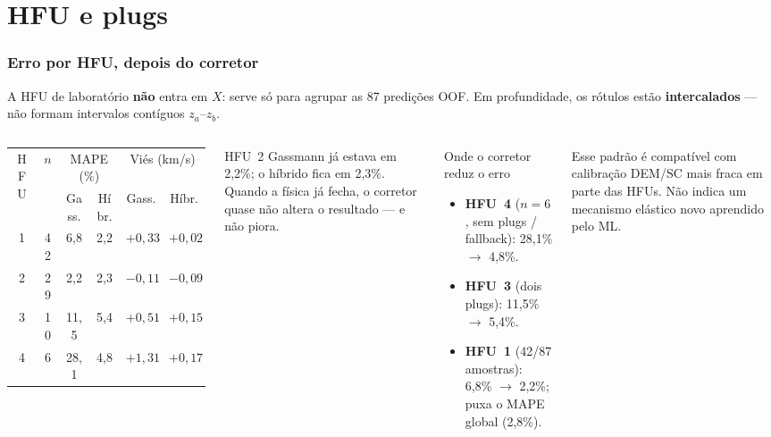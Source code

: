 \documentclass[aspectratio=169,10pt]{beamer}
\begin{document}
\section{HFU e plugs}

\begin{frame}[shrink=5]
  \frametitle{Erro por HFU, depois do corretor}
  \footnotesize
  A HFU de laboratório \textbf{não} entra em $X$: serve só para
  agrupar as 87 predições OOF. Em profundidade, os rótulos estão
  \textbf{intercalados} --- não formam intervalos contíguos
  $z_a$--$z_b$.
  \vspace{0.06cm}
  \begin{columns}[T,onlytextwidth]
    \centering
    \scriptsize
    \setlength{\tabcolsep}{4pt}
    \begin{tabular}{cccccc}
      \toprule
      \multirow{2}{*}{HFU} & \multirow{2}{*}{$n$} &
      \multicolumn{2}{c}{MAPE (\%)} & \multicolumn{2}{c}{Viés (km/s)} \\
      \cmidrule(lr){3-4}\cmidrule(lr){5-6}
       & & Gass. & Híbr. & Gass. & Híbr. \\
      \midrule
      1 & 42 & 6,8 & 2,2 & $+0{,}33$ & $+0{,}02$ \\
      2 & 29 & 2,2 & 2,3 & $-0{,}11$ & $-0{,}09$ \\
      3 & 10 & 11,5 & 5,4 & $+0{,}51$ & $+0{,}15$ \\
      4 & 6  & 28,1 & 4,8 & $+1{,}31$ & $+0{,}17$ \\
      \bottomrule
    \end{tabular}
    \vspace{0.10cm}
    \begin{exampleblock}{HFU~2}
      \scriptsize
      Gassmann já estava em 2,2\%; o híbrido fica em 2,3\%.
      Quando a física já fecha, o corretor quase não altera
      o resultado --- e não piora.
    \end{exampleblock}
    \begin{block}{Onde o corretor reduz o erro}
      \scriptsize
      \begin{itemize}\setlength{\itemsep}{0.12em}
        \item \textbf{HFU~4} ($n=6$, sem plugs / fallback):
              28,1\% $\rightarrow$ 4,8\%.
        \item \textbf{HFU~3} (dois plugs):
              11,5\% $\rightarrow$ 5,4\%.
        \item \textbf{HFU~1} (42/87 amostras):
              6,8\% $\rightarrow$ 2,2\%;
              puxa o MAPE global (2,8\%).
      \end{itemize}
    \end{block}
    \vspace{0.06cm}
    {\scriptsize
    Esse padrão é compatível com calibração DEM/SC mais fraca
    em parte das HFUs. Não indica um mecanismo elástico novo
    aprendido pelo ML.}
  \end{columns}
\end{frame}
\end{document}

